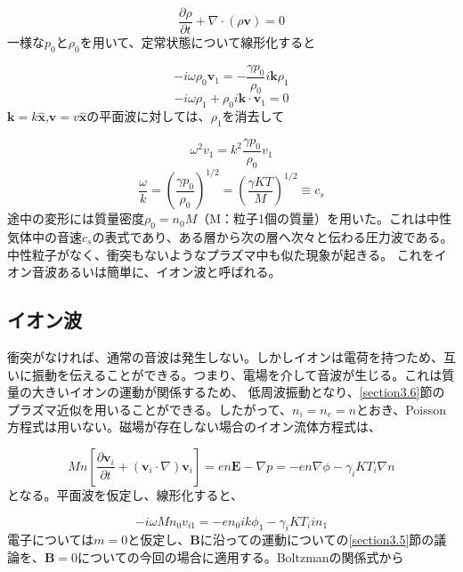 \documentclass{ltjsarticle}
\numberwithin{equation}{section} %
\begin{document}
\begin{equation}
  \frac{\partial \rho}{\partial t} + \nabla \cdot (\rho \bm{v}) = 0 \label{4.33}
\end{equation}
一様な$p_0$と$\rho_0$を用いて、定常状態について線形化すると

\begin{equation}
  -i\omega \rho_0 \bm{v}_1 = -\frac{\gamma p_0}{\rho_0}i\bm{k}\rho_1 \label{4.34}
\end{equation}
\begin{equation}
  -i\omega \rho_1 + \rho_0 i\bm{k}\cdot \bm{v}_1 = 0 \label{4.35}
\end{equation}
$\bm{k} = k\hat{\bm{x}}$,$\bm{v} = v\hat{\bm{x}}$の平面波に対しては、$\rho_1$を消去して

\[
  \omega^2v_1 = k^2\frac{\gamma p_0}{\rho_0}v_1
\]
\begin{equation}
  \boxed{\frac{\omega}{k} = \left(\frac{\gamma p_0}{\rho_0}\right)^{1/2} = \left(\frac{\gamma KT}{M}\right)^{1/2} \equiv c_s} \label{4.36} 
\end{equation}
途中の変形には質量密度$\rho_0 = n_0M$（M：粒子1個の質量）を用いた。これは中性気体中の音速$c_s$の表式であり、ある層から次の層へ次々と伝わる圧力波である。中性粒子がなく、衝突もないようなプラズマ中も似た現象が起きる。
これをイオン音波あるいは簡単に、イオン波と呼ばれる。


\subsection{イオン波} \label{section4.6}
衝突がなければ、通常の音波は発生しない。しかしイオンは電荷を持つため、互いに振動を伝えることができる。つまり、電場を介して音波が生じる。これは質量の大きいイオンの運動が関係するため、
低周波振動となり、\ref{section3.6}節のプラズマ近似を用いることができる。したがって、$n_i = n_e = n$とおき、Poisson方程式は用いない。磁場が存在しない場合のイオン流体方程式は、

\begin{equation}
  Mn\left[\frac{\partial \bm{v}_i}{\partial t} + (\bm{v}_i \cdot \nabla)\bm{v}_i\right] = en\bm{E} - \nabla p = -en\nabla \phi - \gamma_i KT_i \nabla n \label{4.37}
\end{equation}
となる。平面波を仮定し、線形化すると、

\begin{equation}
  -i\omega Mn_0v_{i1} = -en_0ik\phi_1 - \gamma_i KT_i in_1 \label{4.38}
\end{equation}
電子については$m=0$と仮定し、$\bm{B}$に沿っての運動についての\ref{section3.5}節の議論を、$\bm{B} = 0$についての今回の場合に適用する。Boltzmanの関係式から
\end{document}
